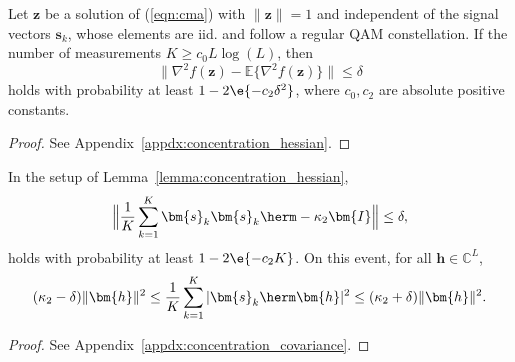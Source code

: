 
\begin{lem} \label{lemma:concentration_hessian} 
Let $\bm{z}$ be a solution of (\ref{eqn:cma}) with $\|\bm{z}\|=1$ and independent of the signal vectors $\bm{s}_k$, whose elements are iid. and follow a regular QAM constellation. If the number of measurements $K\geq c_0L\log(L)$, then
	\begin{equation}
	\|\nabla^2 f(\bm{z}) - \mathbb{E}\{\nabla^2 f(\bm{z})\}\| \leq \delta \label{eqn:concentration_hessian}
	\end{equation}
	holds with probability at least $1 -2\e{-c_2\delta^2}$, where $c_0,c_2$ are absolute positive constants.
\end{lem}
\begin{proof}
	See Appendix~\ref{appdx:concentration_hessian}.
\end{proof} 

\begin{lem}  \label{lemma:concentration_covariance}
	In the setup of Lemma~\ref{lemma:concentration_hessian},
	\begin{equation}
	\Big\|\frac{1}{K}\sum_{k=1}^K\bm{s}_k\bm{s}_k\herm-\kappa_2\bm{I}\Big\| \leq \delta,
	\end{equation}
	holds with probability at least $1-2\e{-c_2 K}$. On this event, for all $\bm{h}\in\mathbb{C}^L$,
	\begin{equation}
	(\kappa_2-\delta)\|\bm{h}\|^2\leq \frac{1}{K}\sum_{k=1}^K|\bm{s}_k\herm\bm{h}|^2 \leq(\kappa_2+\delta)\|\bm{h}\|^2. \label{eqn:concentration_covariance}
	\end{equation}
\end{lem}
\begin{proof}
	See Appendix~\ref{appdx:concentration_covariance}.
\end{proof}

